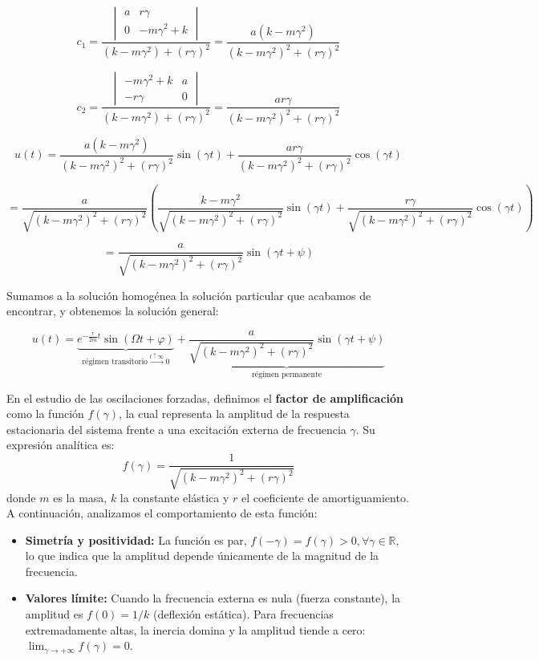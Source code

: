 \[
    c_1 = \frac{\begin{vmatrix}
        a & r \gamma \\
        0 & -m \gamma^2 + k
    \end{vmatrix} }{(k - m \gamma^2) + (r \gamma)^2} = \frac{a(k - m \gamma^2)}{(k - m \gamma^2)^2 + (r \gamma)^2}
\]

\[
    c_2 = \frac{\begin{vmatrix}
        -m \gamma^2 + k & a \\
        -r \gamma & 0
    \end{vmatrix} }{(k - m \gamma^2) + (r \gamma)^2} = \frac{a r \gamma}{(k - m \gamma^2)^2 + (r \gamma)^2}
\]

\[
    u(t) = \frac{a(k - m \gamma^2)}{(k - m \gamma^2)^2 + (r \gamma)^2} \sin(\gamma t) + \frac{a r \gamma}{(k - m \gamma^2)^2 + (r \gamma)^2} \cos(\gamma t)
\]

\[
    = \frac{a}{\sqrt{(k - m \gamma^2)^2 + (r \gamma)^2}} \left( \frac{k - m \gamma^2}{\sqrt{(k - m \gamma^2)^2 + (r \gamma)^2}} \sin(\gamma t) + \frac{r \gamma}{\sqrt{(k - m \gamma^2)^2 + (r \gamma)^2}} \cos(\gamma t) \right)
\]

\[
    = \frac{a}{\sqrt{(k - m \gamma^2)^2 + (r \gamma)^2}} \sin(\gamma t + \psi)
\]

Sumamos a la solución homogénea la solución particular que acabamos de encontrar, y obtenemos la solución general:

\[
    u(t) = \underbrace{e^{-\frac{r}{2m} t} \sin(\Omega t + \varphi)}_{\text{régimen transitorio} \xrightarrow{t \uparrow \infty}0} + \underbrace{\frac{a}{\sqrt{(k - m \gamma^2)^2 + (r \gamma)^2}} \sin(\gamma t + \psi)}_{\text{régimen permanente}}
\]

En el estudio de las oscilaciones forzadas, definimos el \textbf{factor de amplificación} como la función $f(\gamma)$, la cual representa la amplitud de la respuesta estacionaria del sistema frente a una excitación externa de frecuencia $\gamma$. Su expresión analítica es:
\[ f(\gamma) = \frac{1}{\sqrt{(k - m \gamma^2)^2 + (r \gamma)^2}} \]
donde $m$ es la masa, $k$ la constante elástica y $r$ el coeficiente de amortiguamiento. A continuación, analizamos el comportamiento de esta función:

\begin{itemize}
    \item \textbf{Simetría y positividad:} La función es par, $f(-\gamma) = f(\gamma) > 0, \forall \gamma \in \mathbb{R}$, lo que indica que la amplitud depende únicamente de la magnitud de la frecuencia.
    \item \textbf{Valores límite:} Cuando la frecuencia externa es nula (fuerza constante), la amplitud es $f(0) = 1/k$ (deflexión estática). Para frecuencias extremadamente altas, la inercia domina y la amplitud tiende a cero: $\lim_{\gamma \to +\infty} f(\gamma) = 0$.
\end{itemize}

